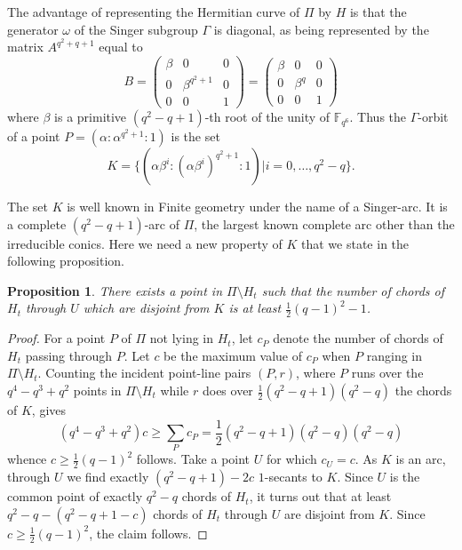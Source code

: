 \documentclass[9pt]{article}
\theoremstyle{plain}
\newtheorem{prop}[thm]{Proposition}
\begin{document}
The advantage of representing the Hermitian curve of $\Pi$ by $H$ is that the generator $\omega$ of the Singer subgroup $\Gamma$ is diagonal, as being represented by the matrix $A^{q^2+q+1}$ equal to
\[B=\left(\begin{array}{ccc}
\beta   & 0& 0\\
0& \beta^{q^2+1}&0\\
0 & 0&1
\end{array}\right)
=\left(\begin{array}{ccc}
\beta   & 0& 0\\
0& \beta^{q} &0\\
0 & 0&1
\end{array}\right)
\]
where $\beta$ is a primitive $(q^2-q+1)$-th root of the unity of $\mathbb{F}_{q^6}$. Thus the $\Gamma$-orbit of a point $P=(\alpha:\alpha^{q^2+1}:1)$ is the set
$$K=\{(\alpha\beta^i:(\alpha\beta^i)^{q^2+1}:1)|i=0,\ldots,q^2-q\}.$$

The set $K$ is well known in Finite geometry under the name of a Singer-arc. It is a complete $(q^2-q+1)$-arc of $\Pi$, the largest known complete arc other than the irreducible conics. Here we need a new property of $K$ that we state in the following proposition. 
\begin{prop}
\label{pro08112025} There exists a point in $\Pi\setminus H_t$ such that the number of chords of $H_t$ through $U$ which are disjoint from $K$ is at least $\frac{1}{2}(q-1)^2-1$. 
\end{prop}
\begin{proof} For a point $P$ of $\Pi$ not lying in $H_t$, let $c_P$ denote the number of chords of $H_t$ passing through $P$. Let $c$ be the maximum value of $c_P$ when $P$ ranging in $\Pi\setminus H_t$.
Counting the incident point-line pairs $(P,r)$, where $P$ runs over the $q^4-q^3+q^2$ points in $\Pi\setminus H_t$ while $r$ does over $\frac{1}{2}(q^2-q+1)(q^2-q)$ the chords of $K$, gives 
$$(q^4-q^3+q^2)c\ge \sum_P c_P=\textstyle{\frac{1}{2}}(q^2-q+1)(q^2-q)(q^2-q)$$ 
whence $c\ge \frac{1}{2}(q-1)^2$ follows. Take a point $U$ for which $c_U=c$. As $K$ is an arc, through $U$ we find exactly $(q^2-q+1)-2c$ $1$-secants to $K$. Since $U$ is the common point of exactly $q^2-q$ chords of $H_t$, it turns out that at least $q^2-q-(q^2-q+1-c)$ chords of $H_t$ through $U$ are disjoint from $K$. Since $c\ge \frac{1}{2}(q-1)^2$, the claim follows.
\end{proof}



\end{document}
